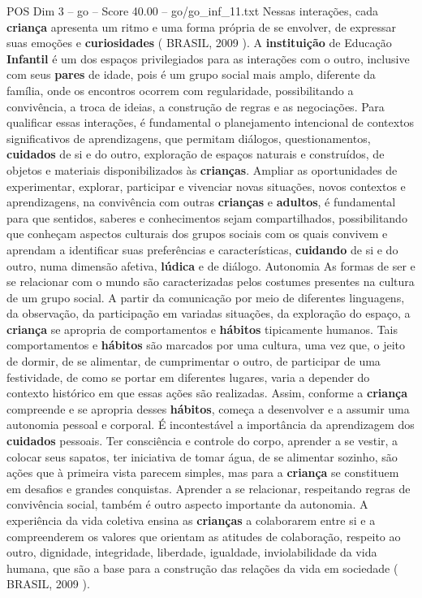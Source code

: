 \begin{textsample}{POS Dim 3 – go – Score 40.00 – go/go\_inf\_11.txt}
Nessas interações, cada \textbf{criança} apresenta um ritmo e uma forma própria de se envolver, de expressar suas emoções e \textbf{curiosidades} ( BRASIL, 2009 ).
A \textbf{instituição} de Educação \textbf{Infantil} é um dos espaços privilegiados para as interações com o outro, inclusive com seus \textbf{pares} de idade, pois é um grupo social mais amplo, diferente da família, onde os encontros ocorrem com regularidade, possibilitando a convivência, a troca de ideias, a construção de regras e as negociações.
Para qualificar essas interações, é fundamental o planejamento intencional de contextos significativos de aprendizagens, que permitam diálogos, questionamentos, \textbf{cuidados} de si e do outro, exploração de espaços naturais e construídos, de objetos e materiais disponibilizados às \textbf{crianças}.
Ampliar as oportunidades de experimentar, explorar, participar e vivenciar novas situações, novos contextos e aprendizagens, na convivência com outras \textbf{crianças} e \textbf{adultos}, é fundamental para que sentidos, saberes e conhecimentos sejam compartilhados, possibilitando que conheçam aspectos culturais dos grupos sociais com os quais convivem e aprendam a identificar suas preferências e características, \textbf{cuidando} de si e do outro, numa dimensão afetiva, \textbf{lúdica} e de diálogo.
Autonomia As formas de ser e se relacionar com o mundo são caracterizadas pelos costumes presentes na cultura de um grupo social.
A partir da comunicação por meio de diferentes linguagens, da observação, da participação em variadas situações, da exploração do espaço, a \textbf{criança} se apropria de comportamentos e \textbf{hábitos} tipicamente humanos.
Tais comportamentos e \textbf{hábitos} são marcados por uma cultura, uma vez que, o jeito de dormir, de se alimentar, de cumprimentar o outro, de participar de uma festividade, de como se portar em diferentes lugares, varia a depender do contexto histórico em que essas ações são realizadas.
Assim, conforme a \textbf{criança} compreende e se apropria desses \textbf{hábitos}, começa a desenvolver e a assumir uma autonomia pessoal e corporal.
É incontestável a importância da aprendizagem dos \textbf{cuidados} pessoais.
Ter consciência e controle do corpo, aprender a se vestir, a colocar seus sapatos, ter iniciativa de tomar água, de se alimentar sozinho, são ações que à primeira vista parecem simples, mas para a \textbf{criança} se constituem em desafios e grandes conquistas.
Aprender a se relacionar, respeitando regras de convivência social, também é outro aspecto importante da autonomia.
A experiência da vida coletiva ensina as \textbf{crianças} a colaborarem entre si e a compreenderem os valores que orientam as atitudes de colaboração, respeito ao outro, dignidade, integridade, liberdade, igualdade, inviolabilidade da vida humana, que são a base para a construção das relações da vida em sociedade ( BRASIL, 2009 ).

\end{textsample}
